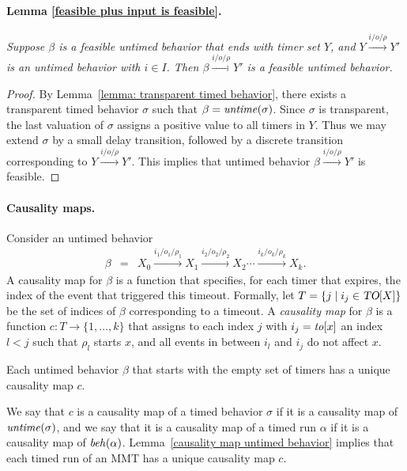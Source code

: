 \paragraph{Lemma \ref{feasible plus input is feasible}.}
\emph{Suppose $\beta$ is a feasible untimed behavior that ends with timer set $Y$, and 
$Y \xrightarrow{i/o/\rho} Y'$ is an untimed behavior with $i \in I$.
Then $\beta \xrightarrow{i/o/\rho} Y'$ is a feasible untimed behavior.}

\begin{proof}
By Lemma~\ref{lemma: transparent timed behavior}, there exists a transparent timed behavior
$\sigma$ such that $\beta = \mathit{untime}(\sigma)$. Since $\sigma$ is transparent, the last valuation of $\sigma$ assigns a positive value to
all timers in $Y$. Thus we may extend $\sigma$ by a small delay transition, followed by a discrete transition corresponding to
$Y \xrightarrow{i/o/\rho} Y'$. This implies that untimed behavior $\beta \xrightarrow{i/o/\rho} Y'$ is feasible.
\end{proof}

\paragraph{Causality maps.} 
Consider an untimed behavior
\begin{eqnarray*}
\beta & = & X_0 \xrightarrow{i_1/o_1/\rho_1} X_1  \xrightarrow{i_2/o_2/\rho_2} X_2 \cdots \xrightarrow{i_k/o_k/\rho_k} X_{k}.
\end{eqnarray*}
A causality map for $\beta$ is a function that specifies, for each timer that expires, the index of the event that
triggered this timeout.
Formally, let $T = \{ j \mid i_j \in \mbox{\sl TO}[X] \}$ be the set of indices of $\beta$ corresponding to a timeout.
A \emph{causality map} for $\beta$ is a function $c: T \rightarrow \{ 1 ,\ldots, k \}$ that assigns
to each index $j$ with $i_j = \mathit{to}[x]$ an index $l < j$ such that $\rho_l$ starts $x$, and all events in between $i_l$ and $i_j$
do not affect $x$.

\begin{lemma}
\label{causality map untimed behavior}
Each untimed behavior $\beta$ that starts with the empty set of timers has a unique causality map $c$.
\end{lemma}
We say that $c$ is a causality map of a timed behavior $\sigma$ if it is a causality map of $\mathit{untime}(\sigma)$,
and we say that it is a causality map of a timed run $\alpha$ if it is a causality map of $\mathit{beh}(\alpha)$.
Lemma~\ref{causality map untimed behavior} implies that each timed run of an MMT has a unique causality map $c$.


